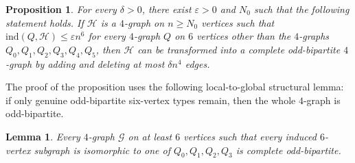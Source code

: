 \documentclass[10pt,a4paper]{article}
\theoremstyle{plain}
\newtheorem{lemma}[lemma]{Lemma}
\newtheorem{proposition}[proposition]{Proposition}
\theoremstyle{definition}
\newcommand{\ind}{\mathrm{ind}}
\begin{document}
\begin{proposition}\label{PROP:structure_from_six_vertex}
For every $\delta>0$, there exist $\varepsilon>0$ and $N_0$ such that the following statement holds.  If $\mathcal H$ is a $4$-graph on $n\ge N_0$ vertices such that $\ind(Q,\mathcal H) \le \varepsilon n^6$ for every $4$-graph $Q$ on $6$ vertices other than the $4$-graphs $Q_0,Q_1,Q_2,Q_3,Q_4,Q_5$, then $\mathcal H$ can be transformed into a complete odd-bipartite $4$-graph by adding and deleting at most $\delta n^4$ edges.
\end{proposition}

The proof of the proposition uses the following local-to-global structural lemma: if only genuine odd-bipartite six-vertex types remain, then the whole $4$-graph is odd-bipartite.

\begin{lemma}\label{LEM:final_structure}
Every $4$-graph $\mathcal G$ on at least $6$ vertices such that every induced $6$-vertex subgraph is isomorphic to one of $Q_0,Q_1,Q_2,Q_3$ is complete odd-bipartite.
\end{lemma}
\end{document}
